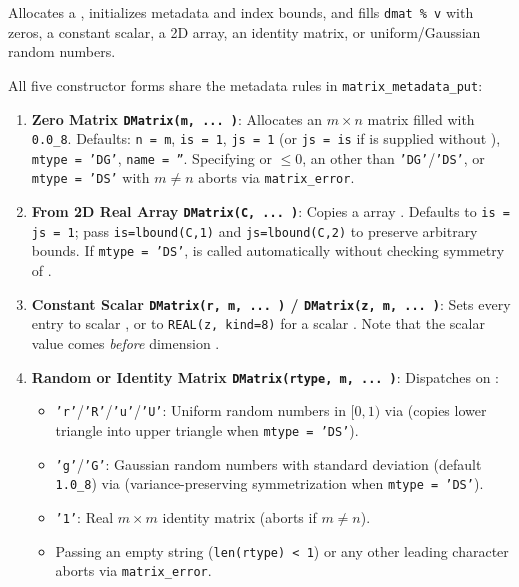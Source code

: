 Allocates a , initializes metadata and index bounds, and fills \texttt{dmat \% v} with zeros, a constant scalar, a 2D  array, an identity matrix, or uniform/Gaussian random numbers.

All five constructor forms share the metadata rules in \texttt{matrix\_metadata\_put}:
\begin{enumerate}
  \item \textbf{Zero Matrix \texttt{DMatrix(m, ... )}}: Allocates an $m \times n$ matrix filled with \texttt{0.0\_8}. Defaults: \texttt{n = m}, \texttt{is = 1}, \texttt{js = 1} (or \texttt{js = is} if  is supplied without ), \texttt{mtype = 'DG'}, \texttt{name = ''}. Specifying  or  $\le 0$, an  other than \texttt{'DG'}/\texttt{'DS'}, or \texttt{mtype = 'DS'} with $m \neq n$ aborts via \texttt{matrix\_error}.
  \item \textbf{From 2D Real Array \texttt{DMatrix(C, ... )}}: Copies a  array . Defaults to \texttt{is = js = 1}; pass \texttt{is=lbound(C,1)} and \texttt{js=lbound(C,2)} to preserve arbitrary bounds. If \texttt{mtype = 'DS'},  is called automatically without checking symmetry of .
  \item \textbf{Constant Scalar \texttt{DMatrix(r, m, ... )} / \texttt{DMatrix(z, m, ... )}}: Sets every entry to  scalar , or to \texttt{REAL(z, kind=8)} for a  scalar . Note that the scalar value comes \emph{before} dimension .
  \item \textbf{Random or Identity Matrix \texttt{DMatrix(rtype, m, ... )}}: Dispatches on :
  \begin{itemize}
    \item \texttt{'r'}/\texttt{'R'}/\texttt{'u'}/\texttt{'U'}: Uniform random numbers in $[0,1)$ via  (copies lower triangle into upper triangle when \texttt{mtype = 'DS'}).
    \item \texttt{'g'}/\texttt{'G'}: Gaussian random numbers with standard deviation  (default \texttt{1.0\_8}) via  (variance-preserving symmetrization when \texttt{mtype = 'DS'}).
    \item \texttt{'1'}: Real $m \times m$ identity matrix (aborts if $m \neq n$).
    \item Passing an empty string (\texttt{len(rtype) < 1}) or any other leading character aborts via \texttt{matrix\_error}.
  \end{itemize}
\end{enumerate}

